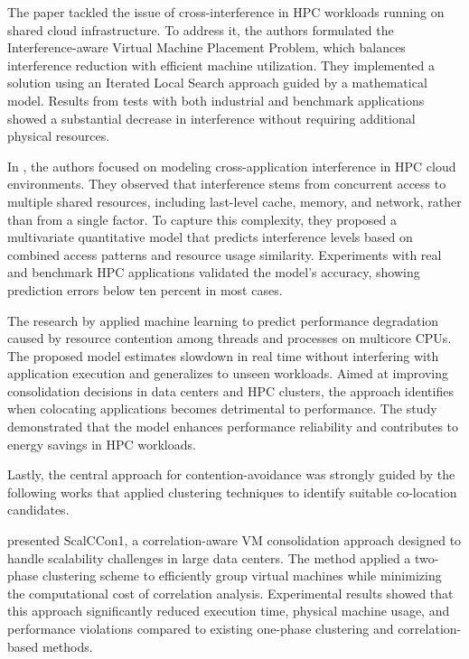 The paper \cite{8748923} tackled the issue of cross-interference in HPC workloads running on shared cloud infrastructure. To address it, the authors formulated the Interference-aware Virtual Machine Placement Problem, which balances interference reduction with efficient machine utilization. They implemented a solution using an Iterated Local Search approach guided by a mathematical model. Results from tests with both industrial and benchmark applications showed a substantial decrease in interference without requiring additional physical resources.

In \cite{Melo_Alves_2017}, the authors focused on modeling cross-application interference in HPC cloud environments. They observed that interference stems from concurrent access to multiple shared resources, including last-level cache, memory, and network, rather than from a single factor. To capture this complexity, they proposed a multivariate quantitative model that predicts interference levels based on combined access patterns and resource usage similarity. Experiments with real and benchmark HPC applications validated the model's accuracy, showing prediction errors below ten percent in most cases.

The research by \cite{6468532} applied machine learning to predict performance degradation caused by resource contention among threads and processes on multicore CPUs. The proposed model estimates slowdown in real time without interfering with application execution and generalizes to unseen workloads. Aimed at improving consolidation decisions in data centers and HPC clusters, the approach identifies when colocating applications becomes detrimental to performance. The study demonstrated that the model enhances performance reliability and contributes to energy savings in HPC workloads.

Lastly, the central approach for contention-avoidance was strongly guided by the following works that applied clustering techniques to identify suitable co-location candidates.

\cite{7237045} presented ScalCCon1, a correlation-aware VM consolidation approach designed to handle scalability challenges in large data centers. The method applied a two-phase clustering scheme to efficiently group virtual machines while minimizing the computational cost of correlation analysis. Experimental results showed that this approach significantly reduced execution time, physical machine usage, and performance violations compared to existing one-phase clustering and correlation-based methods.

